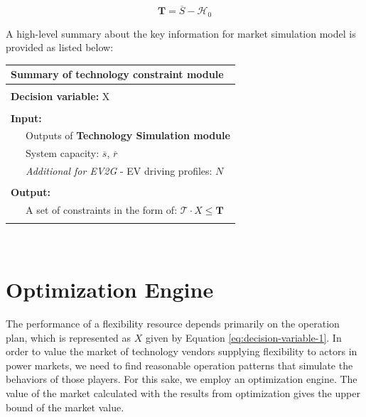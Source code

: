 \begin{equation*}
\mathbf{T} = \overline{S} - \mathcal{H}_0
\end{equation*}

A high-level summary about the key information for market simulation model is provided as listed below:

\begin{table}[h!]
	\begin{tabular}{L{0.95\textwidth}}
		\hline
		\textbf{Summary of technology constraint module} \\
		\hline
		\\
		\textbf{Decision variable:} X\\
		\\
		\textbf{Input:} \\
		~~~Outputs of \textbf{Technology Simulation module}\\
		~~~System capacity: $\overline{s}$, $\overline{r}$\\
		~~~\textit{Additional for EV2G} - EV driving profiles: $N$\\
		\\
		\textbf{Output:} \\
		~~~A set of constraints in the form of: $\mathcal{T} \cdot X \leq \mathbf{T}$ \\
		\\
		\hline
	\end{tabular}
\end{table}
~\newpage



\section{Optimization Engine}
The performance of a flexibility resource depends primarily on the operation plan, which is represented as $X$ given by Equation \eqref{eq:decision-variable-1}. In order to value the market of technology vendors supplying flexibility to actors in power markets, we need to find reasonable operation patterns that simulate the behaviors of those players. For this sake, we employ an optimization engine. The value of the market calculated with the results from optimization gives the upper bound of the market value.

